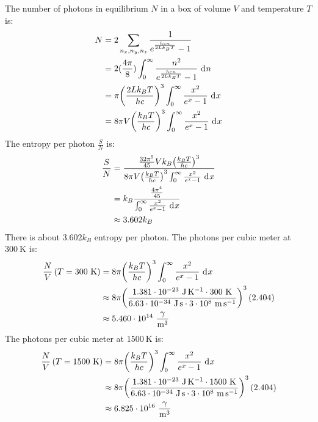 \documentclass{article}
\begin{document}
The number of photons in equilibrium $N$ in a box of volume $V$ and temperature $T$ is:
\begin{equation}
    \begin{split}
        N & = 2\sum_{n_x,n_y,n_z} \frac{1}{e^{\frac{hcn}{2Lk_BT}} - 1} \\
        & = 2(\frac{4\pi}{8})\int_0^{\infty} \frac{n^2}{e^{\frac{hcn}{2Lk_BT}} - 1} \, \diff{n} \\
        & = \pi{\left(\frac{2Lk_BT}{hc}\right)}^3\int_0^{\infty} \frac{x^2}{e^x - 1} \, \diff{x} \\
        & = 8\pi V{\left(\frac{k_BT}{hc}\right)}^3\int_0^{\infty} \frac{x^2}{e^x - 1} \, \diff{x} \\
    \end{split}
\end{equation}
The entropy per photon $\frac{S}{N}$ is:
\begin{equation}
    \begin{split}
        \frac{S}{N} & = \frac{\frac{32\pi^5}{45} Vk_B{\left(\frac{k_BT}{hc}\right)}^3}{8\pi V{\left(\frac{k_BT}{hc}\right)}^3\int_0^{\infty} \frac{x^2}{e^x - 1} \, \diff{x}} \\
        & = k_B\frac{\frac{4\pi^4}{45}}{\int_0^{\infty} \frac{x^2}{e^x - 1} \, \diff{x}} \\
        & \approx 3.602k_B
    \end{split}
\end{equation}
There is about $3.602k_B$ entropy per photon.
The photons per cubic meter at $300~\unit{\kelvin}$ is:
\begin{equation}
    \begin{split}
        \frac{N}{V}\left(T = 300~\unit{\kelvin}\right) & = 8\pi {\left(\frac{k_BT}{hc}\right)}^3\int_0^{\infty} \frac{x^2}{e^x - 1} \, \diff{x} \\
        & \approx 8\pi {\left(\frac{1.381 \cdot 10^{-23}~\unit{\joule\per\kelvin} \cdot 300~\unit{\kelvin}}{6.63 \cdot 10^{-34}~\unit{\joule\second} \cdot 3 \cdot 10^8~\unit{\meter\per\second}}\right)}^3\left(2.404\right) \\
        & \approx 5.460 \cdot 10^{14}~\unit{\frac{\gamma}{\meter\cubed}}  \\
    \end{split}
\end{equation}
The photons per cubic meter at $1500~\unit{\kelvin}$ is:
\begin{equation}
    \begin{split}
        \frac{N}{V}\left(T = 1500~\unit{\kelvin}\right) & = 8\pi {\left(\frac{k_BT}{hc}\right)}^3\int_0^{\infty} \frac{x^2}{e^x - 1} \, \diff{x} \\
        & \approx 8\pi {\left(\frac{1.381 \cdot 10^{-23}~\unit{\joule\per\kelvin} \cdot 1500~\unit{\kelvin}}{6.63 \cdot 10^{-34}~\unit{\joule\second} \cdot 3 \cdot 10^8~\unit{\meter\per\second}}\right)}^3\left(2.404\right) \\
        & \approx 6.825 \cdot 10^{16}~\unit{\frac{\gamma}{\meter\cubed}}  \\
    \end{split}
\end{equation}
\end{document}
